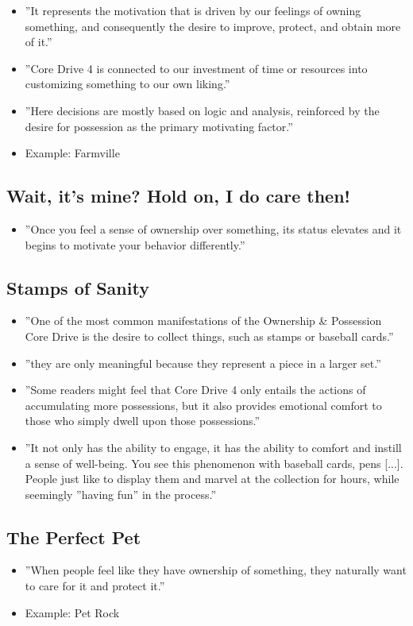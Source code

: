 \begin{itemize}
    \item ''It represents the motivation that is driven by our feelings of owning something, and consequently the desire to improve, protect, and obtain more of it.''
    \item ''Core Drive 4 is connected to our investment of time or resources into customizing something to our own liking.''
    \item ''Here decisions are mostly based on logic and analysis, reinforced by the desire for possession as the primary motivating factor.''
    \item Example: Farmville
\end{itemize}

\subsection{Wait, it's mine? Hold on, I do care then!}
\begin{itemize}
    \item ''Once you feel a sense of ownership over something, its status elevates and it begins to motivate your behavior differently.''
\end{itemize}

\subsection{Stamps of Sanity}
\begin{itemize}
    \item ''One of the most common manifestations of the Ownership \& Possession Core Drive is the desire to collect things, such as stamps or baseball cards.''
    \item ''they are only meaningful because they represent a piece in a larger set.''
    \item ''Some readers might feel that Core Drive 4 only entails the actions of accumulating more possessions, but it also provides emotional comfort to those who simply dwell upon those possessions.''
    \item ''It not only has the ability to engage, it has the ability to comfort and instill a sense of well-being. You see this phenomenon with baseball cards, pens [...]. People just like to display them and marvel at the collection for hours, while seemingly ''having fun'' in the process.''
\end{itemize}

\subsection{The Perfect Pet}
\begin{itemize}
    \item ''When people feel like they have ownership of something, they naturally want to care for it and protect it.''
    \item Example: Pet Rock
\end{itemize}

